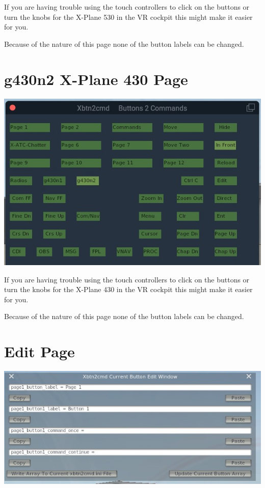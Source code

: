 \documentclass[11pt,parskip=half,a4paper]{scrartcl}
\begin{document}
If you are having trouble using the touch controllers to click on the buttons or turn the knobs for the X-Plane 530 in the VR cockpit this might make it easier for you. \newline

Because of the nature of this page none of the button labels can be changed.

\newpage
\section{g430n2 X-Plane 430 Page}

\begin{center}
\includegraphics[width=15cm]{../pics/Xbtn2cmd_g430n2_430_Page.jpg}
\end{center} 

If you are having trouble using the touch controllers to click on the buttons or turn the knobs for the X-Plane 430 in the VR cockpit this might make it easier for you. \newline

Because of the nature of this page none of the button labels can be changed.

\newpage
\section{Edit Page}

\begin{center}
\includegraphics[width=15cm]{../pics/Xbtn2cmd_Edit_Widget_Page.jpg}
\end{center}
\end{document}
